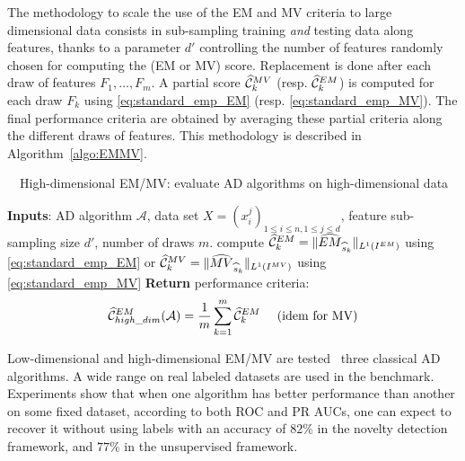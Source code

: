 %
The methodology to scale the use of the EM and MV criteria to large dimensional data consists in sub-sampling training \emph{and} testing data along features, thanks to a parameter $d'$ controlling the number of features randomly chosen for computing the (EM or MV) score. Replacement is done after each draw of features $F_1,\ldots,F_{m}$. A partial score $\widehat {\mathcal{C}}_k^{MV}$ (resp. $\widehat {\mathcal{C}}_k^{EM}$) is computed for each draw $F_k$ using \eqref{eq:standard_emp_EM} (resp. \eqref{eq:standard_emp_MV}). The final performance criteria are obtained by averaging these partial criteria along the different draws of features. This methodology is described in Algorithm~\ref{algo:EMMV}.
%
\begin{algorithm}[!tbh]
\caption{~~High-dimensional EM/MV: evaluate AD algorithms on high-dimensional data}
\label{algo:EMMV}
\begin{algorithmic}
  \STATE \textbf{Inputs}: AD algorithm $\mathcal{A}$, data set $X = (x^j_i)_{1 \le i \le n, 1 \le j \le d }$, feature sub-sampling size $d'$, number of draws $m$.
    \STATE compute $\widehat{\mathcal{C}}_k^{EM} = \| \widehat{EM}_{\widehat s_k} \|_{L^1(I^{EM})}$ using \eqref{eq:standard_emp_EM} or $\widehat{\mathcal{C}}_k^{MV} = \| \widehat{MV}_{\widehat s_k} \|_{L^1(I^{MV})}$ using \eqref{eq:standard_emp_MV}
  \ENDFOR 
  \STATE \textbf{Return} performance criteria: $$\widehat{\mathcal{C}}^{EM}_{high\_dim} (\mathcal{A})= \frac{1}{m} \sum_{k=1}^m\widehat {\mathcal{C}}_k^{EM} \text{~~~~(idem for MV)}$$
\end{algorithmic}
\end{algorithm}

Low-dimensional and high-dimensional EM/MV are tested \wrt~three classical AD algorithms. A wide range on real labeled datasets are used in the benchmark.
Experiments show that when one algorithm has %
better performance than another on some fixed dataset, according to both ROC and PR AUCs, one can expect to recover it without using labels with an accuracy of $82\%$ in the novelty detection framework, and $77\%$ in the unsupervised framework.


